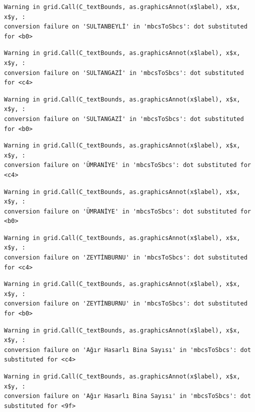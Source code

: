 \documentclass[
  11pt,
  a4paper,
  DIV=11,
  numbers=noendperiod]{scrartcl}
\begin{document}
\begin{verbatim}
Warning in grid.Call(C_textBounds, as.graphicsAnnot(x$label), x$x, x$y, :
conversion failure on 'SULTANBEYLİ' in 'mbcsToSbcs': dot substituted for <b0>
\end{verbatim}

\begin{verbatim}
Warning in grid.Call(C_textBounds, as.graphicsAnnot(x$label), x$x, x$y, :
conversion failure on 'SULTANGAZİ' in 'mbcsToSbcs': dot substituted for <c4>
\end{verbatim}

\begin{verbatim}
Warning in grid.Call(C_textBounds, as.graphicsAnnot(x$label), x$x, x$y, :
conversion failure on 'SULTANGAZİ' in 'mbcsToSbcs': dot substituted for <b0>
\end{verbatim}

\begin{verbatim}
Warning in grid.Call(C_textBounds, as.graphicsAnnot(x$label), x$x, x$y, :
conversion failure on 'ÜMRANİYE' in 'mbcsToSbcs': dot substituted for <c4>
\end{verbatim}

\begin{verbatim}
Warning in grid.Call(C_textBounds, as.graphicsAnnot(x$label), x$x, x$y, :
conversion failure on 'ÜMRANİYE' in 'mbcsToSbcs': dot substituted for <b0>
\end{verbatim}

\begin{verbatim}
Warning in grid.Call(C_textBounds, as.graphicsAnnot(x$label), x$x, x$y, :
conversion failure on 'ZEYTİNBURNU' in 'mbcsToSbcs': dot substituted for <c4>
\end{verbatim}

\begin{verbatim}
Warning in grid.Call(C_textBounds, as.graphicsAnnot(x$label), x$x, x$y, :
conversion failure on 'ZEYTİNBURNU' in 'mbcsToSbcs': dot substituted for <b0>
\end{verbatim}

\begin{verbatim}
Warning in grid.Call(C_textBounds, as.graphicsAnnot(x$label), x$x, x$y, :
conversion failure on 'Ağır Hasarlı Bina Sayısı' in 'mbcsToSbcs': dot
substituted for <c4>
\end{verbatim}

\begin{verbatim}
Warning in grid.Call(C_textBounds, as.graphicsAnnot(x$label), x$x, x$y, :
conversion failure on 'Ağır Hasarlı Bina Sayısı' in 'mbcsToSbcs': dot
substituted for <9f>
\end{verbatim}
\end{document}
